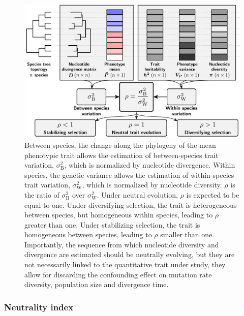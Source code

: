 \documentclass{article}
\newcommand{\RateBetween}{\sigma^2_{\mathrm{B}}}
\newcommand{\RateWhithin}{\sigma^2_{\mathrm{W}}}
\newcommand{\NI}{\rho}
\begin{document}
\begin{figure}[!ht]
    \centering
    \includegraphics[width=\textwidth, page=1] {figure1}
    \caption{
        Between species, the change along the phylogeny of the mean phenotypic trait allows the estimation of between-species trait variation, $\RateBetween$, which is normalized by nucleotide divergence.
        Within species, the genetic variance allows the estimation of within-species trait variation, $\RateWhithin$, which is  normalized by nucleotide diversity.
        $\NI$ is the ratio of $\RateBetween$ over $\RateWhithin$.
        Under neutral evolution, $\NI$ is expected to be equal to one.
        Under diversifying selection, the trait is heterogeneous between species, but homogeneous within species, leading to $\NI$ greater than one.
        Under stabilizing selection, the trait is homogeneous between species, leading to $\NI$ smaller than one.
        Importantly, the sequence from which nucleotide diversity and divergence are estimated should be neutrally evolving, but they are not necessarily linked to the quantitative trait under study, they allow for discarding the confounding effect on mutation rate diversity, population size and divergence time.
    }
    \label{fig:methods}
\end{figure}

\subsubsection*{Neutrality index}
\end{document}
